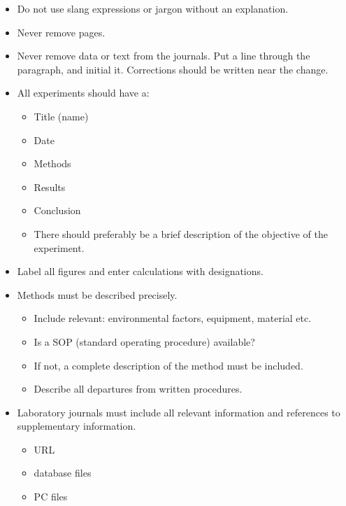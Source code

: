 \begin{itemize}
\item Do not use slang expressions or jargon without an explanation.
\item Never remove pages.
\item Never remove data or text from the journals. Put a line through the
paragraph, and initial it. Corrections should be written near the change.
\item All experiments should have a:
\begin{itemize}
\item Title (name)
\item Date
\item Methods
\item Results
\item Conclusion
\item There should preferably be a brief description of the objective of the experiment.
\end{itemize}

\item Label all figures and enter calculations with designations.

\item Methods must be described precisely.
\begin{itemize}
\item Include relevant: environmental factors,
equipment, material etc.
\item Is a SOP (standard operating procedure)
available?
\item If not, a complete description of the method
must be included.
\item Describe all departures from written
procedures.
\end{itemize}

\item Laboratory journals must include all relevant information and references
to supplementary information.
\begin{itemize}
\item URL
\item database files
\item PC files

\end{itemize}
\end{itemize}
